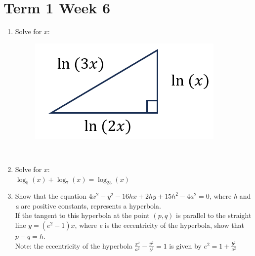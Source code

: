 \documentclass[../main.tex]{subfiles}
\begin{document}
\section*{Term 1 Week 6}
\begin{enumerate}
    \item 
    Solve for \(x\):\\
    \begin{figure}[h]
        \centering
        \includegraphics{images/t1w6q1.png}
    \end{figure}\\

    \item 
    Solve for \(x\):\\

    \setlength{\parindent}{30pt}
    \(\log_5(x)+\log_7(x)=\log_25(x)\)\\

    \item 
    Show that the equation \(4x^2-y^2-16hx+2hy+15h^2-4a^2=0\), where \textit{h} and \textit{a} are positive constants, represents a hyperbola.\\
    
    \setlength{\parindent}{0pt}
    If the tangent to this hyperbola at the point \((p,q)\) is parallel to the straight line \(y=(e^2-1)x\), where \textit{e} is the eccentricity of the hyperbola, show that \(p-q=h \).\\

    Note: the eccentricity of the hyperbola \(\frac{x^2}{a^2}-\frac{y^2}{b^2}=1\) is given by \(e^2=1+\frac{b^2}{a^2}\)
    
\end{enumerate}
\end{document}
